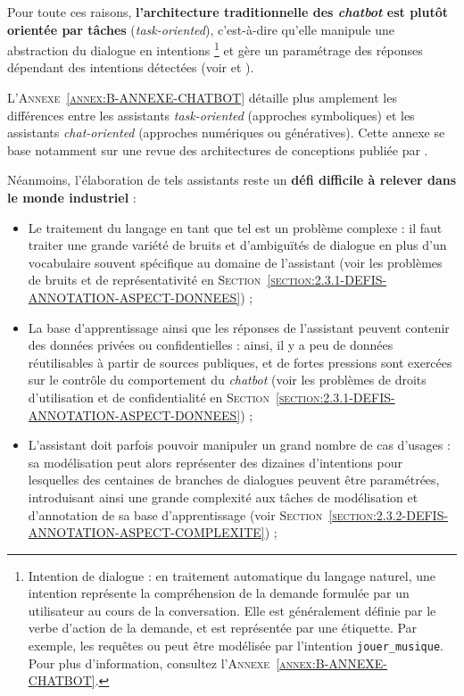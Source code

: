 	Pour toute ces raisons, \textbf{l'architecture traditionnelle des \textit{chatbot} est plutôt orientée par tâches} (\textit{task-oriented}), c'est-à-dire qu'elle manipule une abstraction du dialogue en intentions \footnote{
		Intention de dialogue : en traitement automatique du langage naturel, une intention représente la compréhension de la demande formulée par un utilisateur au cours de la conversation.
		Elle est généralement définie par le verbe d'action de la demande, et est représentée par une étiquette.
		Par exemple, les requêtes  ou  peut être modélisée par l'intention \texttt{jouer\_musique}.
		Pour plus d'information, consultez l'\textsc{Annexe~\ref{annex:B-ANNEXE-CHATBOT}}.
	} et gère un paramétrage des réponses dépendant des intentions détectées (voir \cite{chen-etal:2017:survey-dialogue-systems} et \cite{brabra-etal:2022:dialogue-management-conversational}).
	
	\begin{leftBarInformation}
		L'\textsc{Annexe~\ref{annex:B-ANNEXE-CHATBOT}} détaille plus amplement les différences entre les assistants \textit{task-oriented} (approches symboliques) et les assistants \textit{chat-oriented} (approches numériques ou génératives).
		Cette annexe se base notamment sur une revue des architectures de conceptions publiée par \cite{chen-etal:2017:survey-dialogue-systems}.
	\end{leftBarInformation}
	
	
	Néanmoins, l'élaboration de tels assistants reste un \textbf{défi difficile à relever dans le monde industriel} :
	\begin{itemize}
		\item Le traitement du langage en tant que tel est un problème complexe : il faut traiter une grande variété de bruits et d'ambiguïtés de dialogue en plus d'un vocabulaire souvent spécifique au domaine de l'assistant (voir les problèmes de bruits et de représentativité en \textsc{Section~\ref{section:2.3.1-DEFIS-ANNOTATION-ASPECT-DONNEES}}) ;
		\item La base d'apprentissage ainsi que les réponses de l'assistant peuvent contenir des données privées ou confidentielles : ainsi, il y a peu de données réutilisables à partir de sources publiques, et de fortes pressions sont exercées sur le contrôle du comportement du \textit{chatbot} (voir les problèmes de droits d'utilisation et de confidentialité en \textsc{Section~\ref{section:2.3.1-DEFIS-ANNOTATION-ASPECT-DONNEES}}) ;
		\item L'assistant doit parfois pouvoir manipuler un grand nombre de cas d'usages : sa modélisation peut alors représenter des dizaines d'intentions pour lesquelles des centaines de branches de dialogues peuvent être paramétrées, introduisant ainsi une grande complexité aux tâches de modélisation et d'annotation de sa base d'apprentissage (voir \textsc{Section~\ref{section:2.3.2-DEFIS-ANNOTATION-ASPECT-COMPLEXITE}}) ;
	\end{itemize}
	
